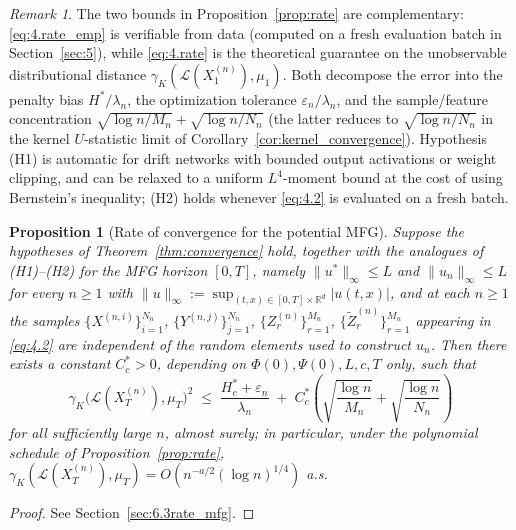 \documentclass[11pt,leqno]{article}
\theoremstyle{plain}
\newtheorem{prop}[thm]{Proposition}
\theoremstyle{remark}
\newtheorem{rem}[thm]{Remark}
\theoremstyle{definition}
\numberwithin{equation}{section}
\numberwithin{figure}{section}
\numberwithin{table}{section}
\numberwithin{algorithm}{section}
\newcommand{\RR}{\mathbb{R}}
\begin{document}
\begin{rem}\label{rem:rate}
The two bounds in Proposition~\ref{prop:rate} are complementary:
\eqref{eq:4.rate_emp} is verifiable from data
(computed on a fresh evaluation batch in Section~\ref{sec:5}),
while \eqref{eq:4.rate} is the theoretical guarantee on the unobservable distributional distance $\gamma_K(\mathcal{L}(X_1^{(n)}),\mu_1)$.
Both decompose the error into the penalty bias $H^*/\lambda_n$,
the optimization tolerance $\varepsilon_n/\lambda_n$,
and the sample/feature concentration $\sqrt{\log n/M_n}+\sqrt{\log n/N_n}$
(the latter reduces to $\sqrt{\log n/N_n}$ in the kernel $U$-statistic limit of Corollary~\ref{cor:kernel_convergence}).
Hypothesis (H1) is automatic for drift networks with bounded output activations or weight clipping,
and can be relaxed to a uniform $L^4$-moment bound at the cost of using Bernstein's inequality;
(H2) holds whenever \eqref{eq:4.2} is evaluated on a fresh batch.
\end{rem}

\begin{prop}[Rate of convergence for the potential MFG]\label{prop:rate_mfg}
Suppose the hypotheses of Theorem~\ref{thm:convergence} hold,
together with the analogues of (H1)--(H2) for the MFG horizon $[0,T]$,
namely $\|u^*\|_\infty\le L$ and $\|u_n\|_\infty\le L$ for every $n\ge 1$ with $\|u\|_\infty:=\sup_{(t,x)\in[0,T]\times\RR^d}|u(t,x)|$,
and at each $n\ge 1$ the samples $\{X^{(n,i)}\}_{i=1}^{N_n}$, $\{Y^{(n,j)}\}_{j=1}^{N_n}$,
$\{Z_r^{(n)}\}_{r=1}^{M_n}$, $\{\tilde Z_r^{(n)}\}_{r=1}^{M_n}$ appearing in \eqref{eq:4.2}
are independent of the random elements used to construct $u_n$.
Then there exists a constant $C^*_c>0$, depending on $\Phi(0),\Psi(0),L,c,T$ only, such that
\begin{equation}\label{eq:4.rate_mfg}
 \gamma_K\bigl(\mathcal{L}(X_T^{(n)}),\mu_T\bigr)^2
 \;\le\; \frac{H^*_c + \varepsilon_n}{\lambda_n}
 \;+\; C^*_c\!\left(\sqrt{\frac{\log n}{M_n}} + \sqrt{\frac{\log n}{N_n}}\right)
\end{equation}
for all sufficiently large $n$, almost surely;
in particular, under the polynomial schedule of Proposition~\ref{prop:rate},
$\gamma_K(\mathcal{L}(X_T^{(n)}),\mu_T)=O(n^{-a/2}(\log n)^{1/4})$ a.s.
\end{prop}
\begin{proof}
See Section~\ref{sec:6.3rate_mfg}.
\end{proof}
\end{document}
